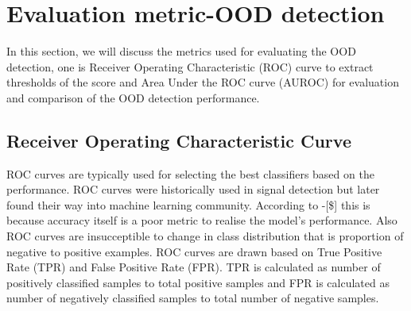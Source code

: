 \section{Evaluation metric-OOD detection}
In this section, we will discuss the metrics used for evaluating the OOD detection, one is Receiver Operating Characteristic (ROC) curve to extract thresholds of the score and Area Under the ROC curve (AUROC) for evaluation and comparison of the OOD detection performance.
\subsection{Receiver Operating Characteristic Curve}
ROC curves are typically used for selecting the best classifiers based on the performance.
ROC curves were historically used in signal detection but later found their way into machine learning community.
According to \cite{}-[\$] this is because accuracy itself is a poor metric to realise the model's performance.
Also ROC curves are insucceptible to change in class distribution that is proportion of negative to positive examples.
ROC curves are drawn based on True Positive Rate (TPR) and False Positive Rate (FPR).
TPR is calculated as number of positively classified samples to total positive samples and FPR is calculated as number of negatively classified samples to total number of negative samples.

